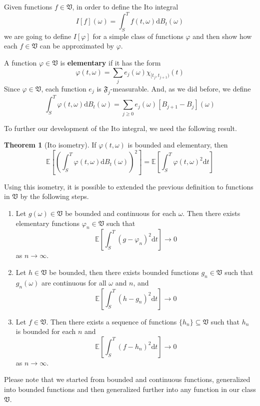 \documentclass[12pt,a4paper]{article}
\theoremstyle{definition}
\newtheorem{theorem}{Theorem}[section]
\begin{document}
Given functions $f \in \mathfrak{V}$, in order to define the Ito integral
\[
	I[f](\omega) = \int_S^T f(t, \omega)\mathrm{d}B_t(\omega)
\]
we are going to define $I[\varphi]$ for a simple class of functions $\varphi$ and then show how each $f \in \mathfrak{V}$ can be approximated by $\varphi$.

A function $\varphi \in \mathfrak{V}$ is \textbf{elementary} if it has the form
\[
	\varphi(t, \omega) = \sum_j e_j(\omega) \chi_{[t_j, t_{j+1})}(t)
\]
Since $\varphi \in \mathfrak{V}$, each function $e_j$ is $\mathfrak{F}_j$-measurable. And, as we did before, we define
\[
	\int_S^T \varphi (t, \omega) \mathrm{d}B_t(\omega) = \sum_{j \geq 0} e_j(\omega) [B_{j+1} - B_j](\omega)
\]

To further our development of the Ito integral, we need the following result.

\begin{theorem}[Ito isometry]
	If $\varphi(t, \omega)$ is bounded and elementary, then
	\[
		\mathbb{E}\left[\left( \int_S^T \varphi(t,\omega) \mathrm{d}B_t(\omega) \right)^2 \right] = \mathbb{E} \left[\int_S^T \varphi(t,\omega)^2 \mathrm{d}t \right]
	\]
\end{theorem}

Using this isometry, it is possible to extended the previous definition to functions in $\mathfrak{V}$ by the following steps.

\begin{enumerate}
	\item Let $g(\omega) \in \mathfrak{V}$ be bounded and continuous for each $\omega$. Then there exists elementary functions $\varphi_n \in \mathfrak{V}$ such that
	\[
		\mathbb{E} \left[ \int_S^T (g-\varphi_n)^2 \mathrm{d}t \right] \longrightarrow 0
	\]
	as $n \to \infty$.
	\item Let $h \in \mathfrak{V}$ be bounded, then there exists bounded functions $g_n \in \mathfrak{V}$ such that $g_n (\omega)$ are continuous for all $\omega$ and $n$, and
	\[
		\mathbb{E} \left[ \int_S^T (h-g_n)^2 \mathrm{d}t \right] \longrightarrow 0
	\]
	\item Let $f \in \mathfrak{V}$. Then there exists a sequence of functions $\{h_n\} \subseteq \mathfrak{V}$ such that $h_n$ is bounded for each $n$ and 
	\[
		\mathbb{E} \left[ \int_S^T (f-h_n)^2 \mathrm{d}t \right] \longrightarrow 0
	\]
	as $n \to \infty$.
\end{enumerate}

Please note that we started from bounded and continuous functions, generalized into bounded functions and then generalized further into any function in our class $\mathfrak{V}$.
\end{document}
